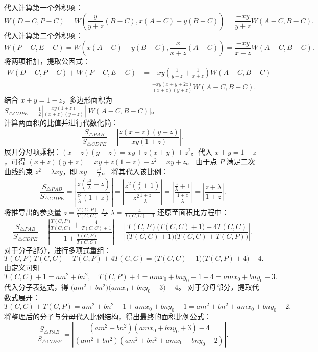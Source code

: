 \begin{solution}
代入计算第一个外积项：
\[ W(D - C, P - C) = W\left( \frac{y}{y+z}(B - C), x(A - C) + y(B - C) \right) = \frac{-xy}{y+z} W(A - C, B - C). \]
代入计算第二个外积项：
\[ W(P - C, E - C) = W\left( x(A - C) + y(B - C), \frac{x}{x+z}(A - C) \right) = \frac{-xy}{x+z} W(A - C, B - C). \]
将两项相加，提取公因式：
\[
\begin{aligned}
W(D - C, P - C) + W(P - C, E - C)
&= -xy \left( \frac{1}{y+z} + \frac{1}{x+z} \right) W(A - C, B - C) \\
&= \frac{-xy(x + y + 2z)}{(x+z)(y+z)} W(A - C, B - C).
\end{aligned}
\]
结合 $x+y=1-z$，多边形面积为 $S_{\triangle CDPE} = \frac{1}{2} \left| \frac{xy(1+z)}{(x+z)(y+z)} \right| |W(A - C, B - C)|$。\\
计算两面积的比值并进行代数化简：
\[ \frac{S_{\triangle PAB}}{S_{\triangle CDPE}} = \left| \frac{z (x+z)(y+z)}{xy (1+z)} \right|. \]
展开分母项乘积：$(x+z)(y+z) = xy + z(x+y) + z^2$。代入 $x+y = 1-z$，可得 $(x+z)(y+z) = xy + z(1-z) + z^2 = xy + z$。
由于点 $P$ 满足二次曲线约束 $z^2 = \lambda xy$，即 $xy = \frac{z^2}{\lambda}$。
将其代入该比例：
\[ \frac{S_{\triangle PAB}}{S_{\triangle CDPE}} = \left| \frac{z \left(\frac{z^2}{\lambda} + z\right)}{\frac{z^2}{\lambda} (1+z)} \right| = \left| \frac{z^2 \left(\frac{z}{\lambda} + 1\right)}{z^2 \frac{1+z}{\lambda}} \right| = \left| \frac{\frac{z}{\lambda} + 1}{\frac{1+z}{\lambda}} \right| = \left| \frac{z + \lambda}{1 + z} \right|. \]
将推导出的参变量 $z = \frac{T(C, P)}{T(C, C)}$ 与 $\lambda = \frac{4}{T(C, C)+1}$ 还原至面积比方程中：
\[ \frac{S_{\triangle PAB}}{S_{\triangle CDPE}} = \left| \frac{\frac{T(C, P)}{T(C, C)} + \frac{4}{T(C, C)+1}}{1 + \frac{T(C, P)}{T(C, C)}} \right| = \left| \frac{T(C, P) \big( T(C, C) + 1 \big) + 4T(C, C)}{\big( T(C, C) + 1 \big) \big( T(C, C) + T(C, P) \big)} \right|. \]
对于分子部分，进行多项式重组：
\[ T(C, P) T(C, C) + T(C, P) + 4T(C, C) = \big( T(C, C) + 1 \big) \big( T(C, P) + 4 \big) - 4. \]
由定义可知
\[ T(C, C) + 1 = am^2 + bn^2, \quad T(C, P) + 4 = amx_0 + bny_0 - 1 + 4 = amx_0 + bny_0 + 3. \]
代入分子表达式，得 $\big( am^2 + bn^2 \big) \big( amx_0 + bny_0 + 3 \big) - 4$。
对于分母部分，提取代数式展开：
\[ T(C, C) + T(C, P) = am^2 + bn^2 - 1 + amx_0 + bny_0 - 1 = am^2 + bn^2 + amx_0 + bny_0 - 2. \]
将整理后的分子与分母代入比例结构，得出最终的面积比例公式：
\[ \frac{S_{\triangle PAB}}{S_{\triangle CDPE}} = \left| \frac{(am^2 + bn^2)(amx_0 + bny_0 + 3) - 4}{(am^2 + bn^2)(am^2 + bn^2 + amx_0 + bny_0 - 2)} \right|. \]

\end{solution}



